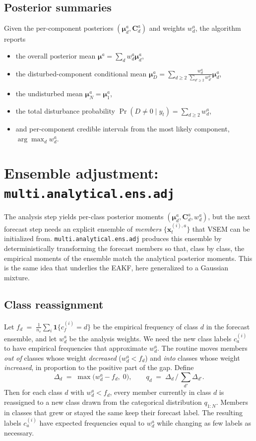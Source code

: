 \documentclass[11pt]{article}
\begin{document}
\subsection{Posterior summaries}

Given the per-component posteriors $(\bm\mu^{a}_d, \bm C^{a}_d)$ and
weights $w^{a}_d$, the algorithm reports
\begin{itemize}
  \item the overall posterior mean
        $\bm\mu^{a} = \sum_d w^{a}_d \bm\mu^{a}_d$,
  \item the disturbed-component conditional mean
        $\bm\mu^{a}_D = \sum_{d\ge 2} \frac{w^{a}_d}{\sum_{d'\ge 2}w^{a}_{d'}}
                          \bm\mu^{a}_d$,
  \item the undisturbed mean $\bm\mu^{a}_N = \bm\mu^{a}_1$,
  \item the total disturbance probability
        $\Pr(D \neq 0 \mid y_t) = \sum_{d\ge 2} w^{a}_d$,
  \item and per-component credible intervals from the most likely
        component, $\arg\max_d w^{a}_d$.
\end{itemize}

\bigskip

\section{Ensemble adjustment: \texttt{multi.analytical.ens.adj}}
\label{sec:adjustment}

The analysis step yields per-class posterior moments
$(\bm\mu^{a}_d, \bm C^{a}_d, w^{a}_d)$, but the next forecast step
needs an explicit ensemble of \emph{members}
$\{\bm x^{(i),a}_t\}$ that VSEM can be initialized from.
\texttt{multi.analytical.ens.adj} produces this ensemble by
deterministically transforming the forecast members so that, class by
class, the empirical moments of the ensemble match the analytical
posterior moments.  This is the same idea that underlies the EAKF, here
generalized to a Gaussian mixture.

\subsection{Class reassignment}

Let
\(
  f_d \;=\; \frac{1}{n_e}\sum_{i} \mathbf 1\{c^{(i)}_f = d\}
\)
be the empirical frequency of class $d$ in the forecast ensemble, and
let $w^{a}_d$ be the analysis weights.  We need the new class labels
$c^{(i)}_a$ to have empirical frequencies that approximate $w^{a}_d$.
The routine moves members \emph{out of} classes whose weight
\emph{decreased} ($w^{a}_d < f_d$) and \emph{into} classes whose weight
\emph{increased}, in proportion to the positive part of the gap.
Define
\[
  \Delta_d \;=\; \max\!\bigl(w^{a}_d - f_d,\; 0\bigr),
  \qquad
  q_d \;=\; \Delta_d \,\Big/\, \textstyle\sum_{d'} \Delta_{d'}.
\]
Then for each class $d$ with $w^{a}_d < f_d$, every member currently in
class $d$ is reassigned to a new class drawn from the categorical
distribution $q_{1:N}$.  Members in classes that grew or stayed the
same keep their forecast label.  The resulting labels $c^{(i)}_a$ have
expected frequencies equal to $w^{a}_d$ while changing as few labels
as necessary.
\end{document}

